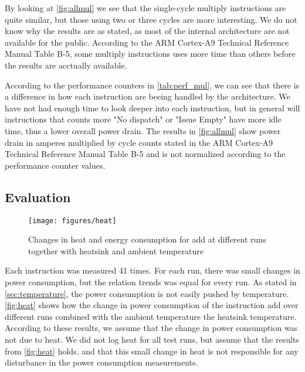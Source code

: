 By looking at \autoref{fig:allmul} we see that the single-cycle multiply
instructions are quite similar, but those using two or three cycles are more
interesting. We do not know why the results are as stated, as most of the
internal architecture are not available for the public. According to the ARM
Cortex-A9 Technical Reference Manual Table B-5, some multiply instructions uses
more time than others before the results are acctually available\cite{armtech}.

According to the performance counters in \autoref{tab:perf_mul}, we can see that
there is a difference in how each instruction are beeing handled by the
architecture. We have not had enough time to look deeper into each instruction,
but in general will instructions that counts more "No dispatch" or "Issue Empty"
have more idle time, thus a lower overall power drain. The results in
\autoref{fig:allmul} show power drain in amperes multiplied by cycle counts
stated in the ARM Cortex-A9 Technical Reference Manual Table B-5\cite{armtech}
and is not normalized according to the performance counter values.

\subsection{Evaluation}
\begin{figure}
    \centering
    \texttt{[image: figures/heat]}
    \caption{Changes in heat and energy consumption for {\ttfamily add} at
    different runs together with heatsink and ambient temperature}
    \label{fig:heat}
\end{figure}

Each instruction was measured 41 times. For each run, there was small changes in
power consumption, but the relation trends was equal for every run.  As stated
in \autoref{sec:temperature}, the power consumption is not easily pushed by
temperature. \autoref{fig:heat} shows how the change in power consumption of the
instruction {\ttfamily add} over different runs combined with the ambient
temperature the heatsink temperature. According to these results, we assume that
the change in power consumption was not due to heat. We did not log heat for all
test runs, but assume that the results from \autoref{fig:heat} holds, and that
this small change in heat is not responsible for any disturbance in the power
consumption measurements.

